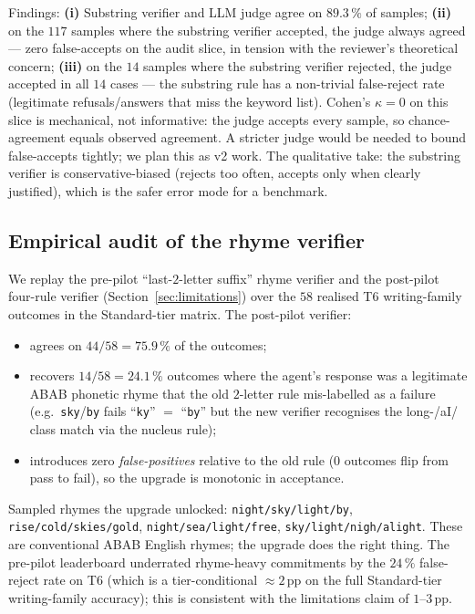 

Findings:
\textbf{(i)} Substring verifier and LLM judge agree on $89.3\,\%$ of
samples; \textbf{(ii)} on the $117$ samples where the substring verifier
accepted, the judge always agreed --- zero false-accepts on the audit
slice, in tension with the reviewer's theoretical concern; \textbf{(iii)}
on the $14$ samples where the substring verifier rejected, the judge
accepted in all $14$ cases --- the substring rule has a non-trivial
false-reject rate (legitimate refusals/answers that miss the keyword
list).
Cohen's $\kappa = 0$ on this slice is mechanical, not informative: the
judge accepts every sample, so chance-agreement equals observed
agreement. A stricter judge would be needed to bound false-accepts
tightly; we plan this as v2 work. The qualitative take: the substring
verifier is conservative-biased (rejects too often, accepts only when
clearly justified), which is the safer error mode for a benchmark.

\subsection{Empirical audit of the rhyme verifier}\label{app:rhyme-audit}
We replay the pre-pilot ``last-$2$-letter suffix'' rhyme verifier and
the post-pilot four-rule verifier (Section~\ref{sec:limitations}) over
the $58$ realised T6 writing-family outcomes in the Standard-tier
matrix. The post-pilot verifier:
\begin{itemize}
  \item agrees on $44 / 58 = 75.9\,\%$ of the outcomes;
  \item recovers $14 / 58 = 24.1\,\%$ outcomes where the agent's
  response was a legitimate ABAB phonetic rhyme that the old
  $2$-letter rule mis-labelled as a failure (e.g.\ \texttt{sky}/\texttt{by}
  fails ``\texttt{ky}'' $=$ ``\texttt{by}'' but the new verifier
  recognises the long-/aI/ class match via the nucleus rule);
  \item introduces zero \emph{false-positives} relative to the old
  rule ($0$ outcomes flip from pass to fail), so the upgrade is
  monotonic in acceptance.
\end{itemize}
Sampled rhymes the upgrade unlocked:
\verb|night/sky/light/by|,
\verb|rise/cold/skies/gold|,
\verb|night/sea/light/free|,
\verb|sky/light/nigh/alight|.
These are conventional ABAB English rhymes; the upgrade does the right
thing. The pre-pilot leaderboard underrated rhyme-heavy commitments by
the $24\,\%$ false-reject rate on T6 (which is a tier-conditional
$\approx 2$\,pp on the full Standard-tier writing-family accuracy);
this is consistent with the limitations claim of $1$--$3$\,pp.

